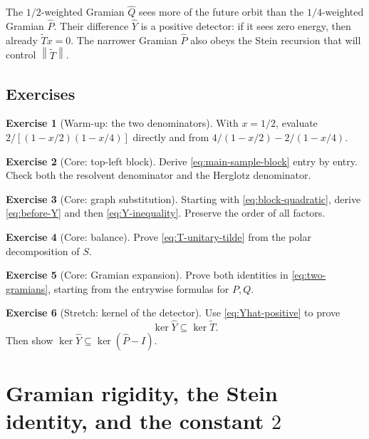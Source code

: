 \documentclass[11pt,oneside,openany]{book}
\theoremstyle{definition}
\newtheorem{exercise}{Exercise}[chapter]
\theoremstyle{remark}
\newcommand{\norm}[1]{\left\lVert #1\right\rVert}
\begin{document}
\begin{intuitionbox}
The \(1/2\)-weighted Gramian \(\widehat Q\) sees more of the future
orbit than the \(1/4\)-weighted Gramian \(\widehat P\).
Their difference \(\widehat Y\) is a positive detector: if it sees
zero energy, then already \(\widetilde T x=0\).  The narrower Gramian
\(\widehat P\) also obeys the Stein recursion that will control
\(\norm{\widetilde T}\).
\end{intuitionbox}

\section{Exercises}

\begin{exercise}[Warm-up: the two denominators]
With \(x=1/2\), evaluate
\(
2/[(1-x/2)(1-x/4)]
\)
directly and from
\(
4/(1-x/2)-2/(1-x/4)
\).
\end{exercise}

\begin{exercise}[Core: top-left block]
\label{ex:top-left-block}
Derive \eqref{eq:main-sample-block} entry by entry.  Check both the
resolvent denominator and the Herglotz denominator.
\end{exercise}

\begin{exercise}[Core: graph substitution]
Starting with \eqref{eq:block-quadratic}, derive
\eqref{eq:before-Y} and then \eqref{eq:Y-inequality}.  Preserve the
order of all factors.
\end{exercise}

\begin{exercise}[Core: balance]
Prove \eqref{eq:T-unitary-tilde} from the polar decomposition of \(S\).
\end{exercise}

\begin{exercise}[Core: Gramian expansion]
\label{ex:gramian-expansion}
Prove both identities in \eqref{eq:two-gramians}, starting from the
entrywise formulas for \(P,Q\).
\end{exercise}

\begin{exercise}[Stretch: kernel of the detector]
Use \eqref{eq:Yhat-positive} to prove
\[
  \ker\widehat Y\subseteq\ker\widetilde T.
\]
Then show
\(
\ker\widehat Y\subseteq\ker(\widehat P-I).
\)
\end{exercise}

\chapter{Gramian rigidity, the Stein identity, and the constant
\texorpdfstring{\(2\)}{2}}
\label{ch:completion-finish}
\end{document}
